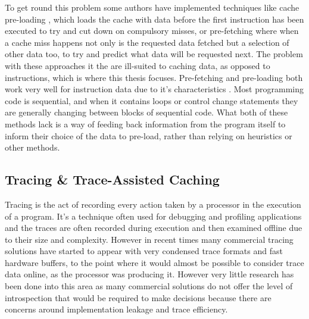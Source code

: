 To get round this problem some authors have implemented techniques like cache pre-loading \cite{ozawaCacheMissHeuristics1995}, which loads the cache with data before the first instruction has been executed to try and cut down on compulsory misses, or pre-fetching \cite{garsideRealtimePrefetchingSharedmemory2015} where when a cache miss happens not only is the requested data fetched but a selection of other data too, to try and predict what data will be requested next. The problem with these approaches it the are ill-suited to caching data, as opposed to instructions, which is where this thesis focuses. Pre-fetching and pre-loading both work very well for instruction data due to it's characteristics \cite{leeWhenPrefetchingWorks2012, smithCacheMemories1982}. Most programming code is sequential, and when it contains loops or control change statements they are generally changing between blocks of sequential code. What both of these methods lack is a way of feeding back information from the program itself to inform their choice of the data to pre-load, rather than relying on heuristics or other methods.


\subsection{Tracing \& Trace-Assisted Caching}

Tracing is the act of recording every action taken by a processor in the execution of a program. It's a technique often used for debugging and profiling applications and the traces are often recorded during execution and then examined offline due to their size and complexity. However in recent times many commercial tracing solutions have started to appear \cite{CoreSightBaseSystem18, NiosIIProcessor2019} with very condensed trace formats and fast hardware buffers, to the point where it would almost be possible to consider trace data online, as the processor was producing it. However very little research has been done into this area \cite{ponugotiEnablingOntheFlyHardware2019} as many commercial solutions do not offer the level of introspection that would be required to make decisions because there are concerns around implementation leakage and trace efficiency.

